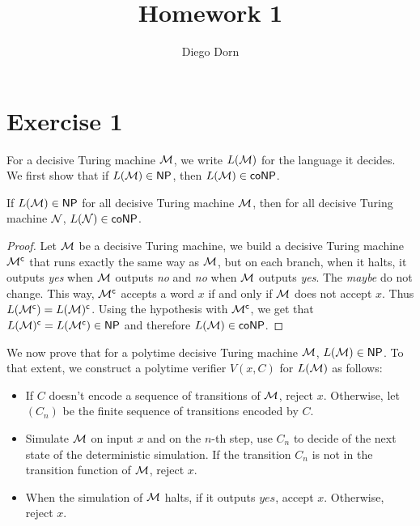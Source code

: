 

\usepackage[backend=biber,style=alphabetic]{biblatex}


\title{Homework 1}
\author{Diego Dorn}


    \maketitle


    \section*{Exercise 1}

    For a decisive Turing machine $\mathcal{M}$, we write $L(\mathcal{M})$ for the language it decides.
    We first show that if $L(\mathcal{M}) \in \mathsf{NP}$, then $L(\mathcal{M}) \in \mathsf{coNP}$.

    \begin{claim}
        If 
        $L(\mathcal{M}) \in \mathsf{NP}$ 
        for all decisive Turing machine $\mathcal{M}$, 
        then for all decisive Turing machine $\mathcal{N}$,
        $L(\mathcal{N}) \in \mathsf{coNP}$.
    \end{claim}

    \begin{proof}
        Let $\mathcal{M}$ be a decisive Turing machine,
        we build a decisive Turing machine $\mathcal{M}^\mathsf{c}$
        that runs exactly the same way as $\mathcal{M}$, but on each branch,
        when it halts, it outputs \textit{yes} when $\mathcal{M}$ outputs \textit{no}
        and \textit{no} when $\mathcal{M}$ outputs \textit{yes}. The \textit{maybe} 
        do not change. This way, $\mathcal{M}^\mathsf{c}$ accepts a word $x$ if and only
        if $\mathcal{M}$ does not accept $x$. 
        Thus $L(\mathcal{M}^\mathsf{c}) = L(\mathcal{M})^\mathsf{c}$.
        Using the hypothesis with $\mathcal{M}^\mathsf{c}$, 
        we get that $L(\mathcal{M})^\mathsf{c} = L(\mathcal{M}^\mathsf{c})  \in \mathsf{NP}$
        and therefore $L(\mathcal{M}) \in \mathsf{coNP}$.
    \end{proof}

    We now prove that for a polytime decisive Turing machine $\mathcal{M}$, 
    $L(\mathcal{M}) \in \mathsf{NP}$.
    To that extent, we construct a polytime verifier $V(x, C)$ for $L(\mathcal{M})$
    as follows:
    \begin{itemize}
        \item If $C$ doesn't encode a sequence of transitions of $\mathcal{M}$, reject $x$. 
            Otherwise, let $(C_n)$ be the finite sequence of transitions encoded by $C$.
        \item Simulate $\mathcal{M}$ on input $x$ and on the $n$-th step, use $C_n$ to decide 
            of the next state of the deterministic simulation. 
            If the transition $C_n$ is not in the transition function of $\mathcal{M}$, reject $x$.
        \item When the simulation of $\mathcal{M}$ halts, if it outputs $yes$, 
            accept $x$. Otherwise, reject $x$.
    \end{itemize}

